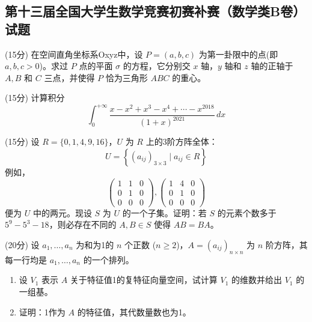 \documentclass[loose]{ExBook}
\begin{document}
\subsection{第十三届全国大学生数学竞赛初赛补赛（数学类B卷）试题}
\begin{qitems}
    \begin{bbox}
        \qitem (15分) 在空间直角坐标系Oxyz中，设 \( P = (a, b, c) \) 为第一卦限中的点(即 \( a, b, c > 0 \))。求过 \( P \) 点的平面 \(\sigma\) 的方程，它分别交 \( x \) 轴，\( y \) 轴和 \( z \) 轴的正轴于 \( A, B \) 和 \( C \) 三点，并使得 \( P \) 恰为三角形 \( ABC \) 的重心。
    \end{bbox}

    \begin{bbox}
        \qitem (15分) 计算积分 
        \[ 
        \int_{0}^{+\infty} \frac{x - x^2 + x^3 - x^4 + \cdots - x^{2018}}{(1 + x)^{2021}} \, dx 
        \]
    \end{bbox}

    \begin{bbox}
        \qitem (15分) 设 \( R = \{0, 1, 4, 9, 16\} \)，\( U \) 为 \( R \) 上的3阶方阵全体：
        \[ 
        U = \left\{ (a_{ij})_{3 \times 3} \mid a_{ij} \in R \right\}
        \]
        例如，
        \[
        \begin{pmatrix}
        1 & 1 & 0 \\
        0 & 1 & 0 \\
        0 & 0 & 0
        \end{pmatrix},
        \begin{pmatrix}
        1 & 4 & 0 \\
        0 & 1 & 0 \\
        0 & 0 & 0
        \end{pmatrix}
        \]
        便为 \( U \) 中的两元。现设 \( S \) 为 \( U \) 的一个子集。证明：若 \( S \) 的元素个数多于 \( 5^9 - 5^3 - 18 \)，则必存在不同的 \( A, B \in S \) 使得 \( AB = BA \)。
    \end{bbox}

    \begin{bbox}
        \qitem (20分) 设 \( a_1, \ldots, a_n \) 为和为1的 \( n \) 个正数 (\( n \geq 2 \))，\( A = (a_{ij})_{n \times n} \) 为 \( n \) 阶方阵，其每一行均是 \( a_1, \ldots, a_n \) 的一个排列。

        \begin{enumerate}[label=(\arabic*)]
            \item 设 \( V_1 \) 表示 \( A \) 关于特征值1的复特征向量空间，试计算 \( V_1 \) 的维数并给出 \( V_1 \) 的一组基。
            \item 证明：1作为 \( A \) 的特征值，其代数量数也为1。
        \end{enumerate}
    \end{bbox}


\end{qitems}
\end{document}
